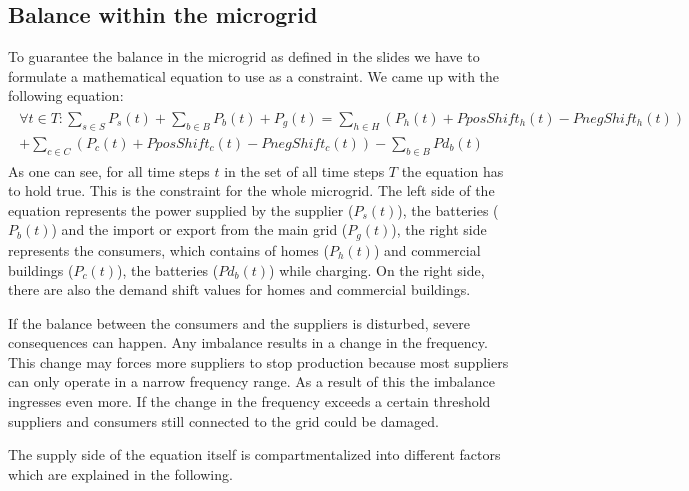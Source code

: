 \subsection{Balance within the microgrid}
To guarantee the balance in the microgrid as defined in the slides we have to formulate a mathematical equation to use as a constraint.
We came up with the following equation:\\
\begin{align} \label{eq1:balance}
\begin{split}
\forall t \in T: \sum\limits_{s \in S}{P_{s}(t)} + \sum\limits_{b \in B}{P_{b}(t)} + P_{g}(t) = \sum_{h \in H}({P_{h}(t)} + PposShift_h(t) - PnegShift_h(t))
\\ + \sum_{c \in C}({P_{c}(t)} + PposShift_c(t) - PnegShift_c(t)) - \sum\limits_{b \in B}{Pd_{b}(t)}
\end{split}
\end{align}
As one can see, for all time steps $t$ in the set of all time steps $T$ the equation has to hold true. 
This is the constraint for the whole microgrid. 
The left side of the equation represents the power supplied by the supplier ($P_{s}(t)$), the batteries ($P_{b}(t)$) and the import or export from the main grid ($P_{g}(t)$), the right side represents the consumers, which contains of homes ($P_{h}(t)$) and commercial buildings ($P_{c}(t)$), the batteries ($Pd_{b}(t)$) while charging. 
On the right side, there are also the demand shift values for homes and commercial buildings.

If the balance between the consumers and the suppliers is disturbed, severe consequences can happen. 
Any imbalance results in a change in the frequency. 
This change may forces more suppliers to stop production because most suppliers can only operate in a narrow frequency range. 
As a result of this the imbalance ingresses even more. 
If the change in the frequency exceeds a certain threshold suppliers and consumers still connected to the grid could be damaged. 

The supply side of the equation itself is compartmentalized into different factors which are explained in the following.

